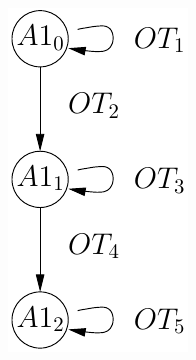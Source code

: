 \documentclass{lncs/llncs}
\begin{document}
\begin{figure}[h]
  \begin{minipage}{2cm}
  \includegraphics[width=\linewidth]{XFIG/PQR-automaton}
  \end{minipage}
  \hspace{10mm}
  \begin{minipage}{7cm}

\end{minipage}
\end{figure}
\end{document}
